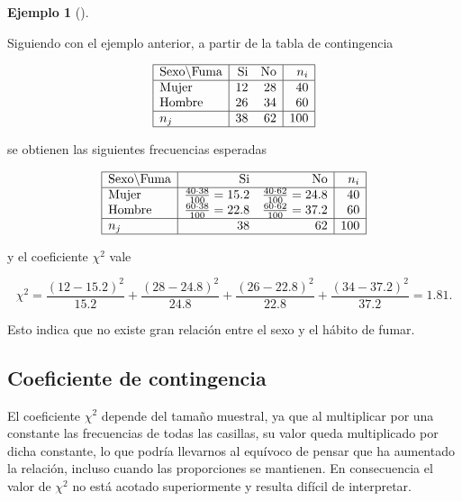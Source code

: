 \documentclass[
  a4paper,
]{scrreport}
\theoremstyle{plain}
\theoremstyle{definition}
\theoremstyle{definition}
\newtheorem{example}{Ejemplo}[chapter]
\theoremstyle{remark}
\begin{document}
\begin{example}[]\protect\hypertarget{exm-coeficiente-chi-cuadrado}{}\label{exm-coeficiente-chi-cuadrado}

Siguiendo con el ejemplo anterior, a partir de la tabla de contingencia

\[
\begin{array}{|l|rr|r|}
\hline
\mbox{Sexo}\backslash\mbox{Fuma} & \mbox{Si} & \mbox{No} & n_i\\
\hline
\mbox{Mujer} & 12 & 28 & 40 \\
\mbox{Hombre} & 26 & 34 & 60 \\
\hline
n_j & 38 & 62 & 100\\
\hline
\end{array}
\]

se obtienen las siguientes frecuencias esperadas

\[
\begin{array}{|l|rr|r|}
\hline
\mbox{Sexo}\backslash\mbox{Fuma} & \mbox{Si} & \mbox{No} & n_i\\
\hline
\mbox{Mujer} & \frac{40\cdot 38}{100}=15.2 & \frac{40\cdot 62}{100}=24.8 & 40 \\
\mbox{Hombre} & \frac{60\cdot 38}{100}=22.8 & \frac{60\cdot 62}{100}=37.2 & 60 \\
\hline
n_j & 38 & 62 & 100\\
\hline
\end{array}
\]

y el coeficiente \(\chi^2\) vale

\[\chi^2 = \frac{(12-15.2)^2}{15.2}+\frac{(28-24.8)^2}{24.8}+\frac{(26-22.8)^2}{22.8}+\frac{(34-37.2)^2}{37.2} = 1.81.\]

Esto indica que no existe gran relación entre el sexo y el hábito de
fumar.

\end{example}

\subsection{Coeficiente de
contingencia}\label{coeficiente-de-contingencia}

El coeficiente \(\chi^2\) depende del tamaño muestral, ya que al
multiplicar por una constante las frecuencias de todas las casillas, su
valor queda multiplicado por dicha constante, lo que podría llevarnos al
equívoco de pensar que ha aumentado la relación, incluso cuando las
proporciones se mantienen. En consecuencia el valor de \(\chi^2\) no
está acotado superiormente y resulta difícil de interpretar.
\end{document}
